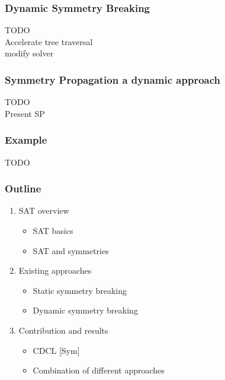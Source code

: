 \documentclass{beamer}
\begin{document}
\begin{frame}
\frametitle{Dynamic Symmetry Breaking}
TODO\\

Accelerate tree traversal\\

modify solver \\

\end{frame}
\begin{frame}
\frametitle{Symmetry Propagation a dynamic approach}
TODO\\
Present SP
\end{frame}

\begin{frame}
\frametitle{Example}
TODO\\

\end{frame}

\begin{frame}
\frametitle{Outline}
\begin{enumerate}
	\item \textcolor{UPMCEngagementBlueB}{SAT overview}
	\begin{itemize}
		\item[] SAT basics
		\item[] SAT and symmetries
	\end{itemize}
	\vspace{5pt}
	\item \textcolor{UPMCEngagementBlueB}{Existing approaches}
	\begin{itemize}
		\item[] Static symmetry breaking
		\item[] Dynamic symmetry breaking
	\end{itemize}
	\vspace{5pt}
	\item \textcolor{UPMCEngagementBlueB}{Contribution and results} 
	\begin{itemize}
		\item[] CDCL [Sym]
		\item[] Combination of different approaches
	\end{itemize}
\end{enumerate}
\end{frame}
\end{document}
